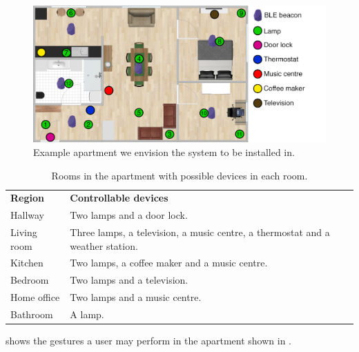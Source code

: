 \begin{figure}[h!]
\centering
\includegraphics[width=\textwidth]{images/room-with-beacons}
\caption{Example apartment we envision the system to be installed in.}
\label{fig:analysis:scenario:apartment}
\end{figure}

\begin{table}[h!]
\centering
\caption{Rooms in the apartment with possible devices in each room.}
\label{tbl:analysis:scenario:rooms}
\begin{tabular}{ll}
\textbf{Region} & \textbf{Controllable devices}                                                 \\
Hallway         & Two lamps and a door lock.                                                    \\
Living room     & Three lamps, a television, a music centre, a thermostat and a weather station.\\
Kitchen         & Two lamps, a coffee maker and a music centre.                                 \\
Bedroom         & Two lamps and a television.                                                   \\
Home office     & Two lamps and a music centre.                                                 \\
Bathroom        & A lamp.                                                                      
\end{tabular}
\end{table}

 shows the gestures a user may perform in the apartment shown in .

